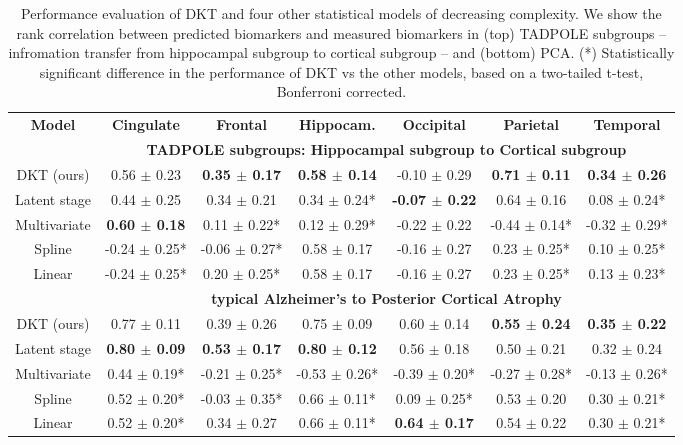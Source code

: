 \documentclass{llncs}
\begin{document}
\begin{table}
\centering
\fontsize{7}{10}\selectfont
\begin{tabular}{c | c c c c c c}
\textbf{Model} & \textbf{Cingulate} & \textbf{Frontal} & \textbf{Hippocam.} & \textbf{Occipital} & \textbf{Parietal} & \textbf{Temporal}\\
& \multicolumn{6}{c}{\textbf{TADPOLE subgroups: Hippocampal subgroup to Cortical subgroup}}\\
DKT (ours) &      0.56 $\pm$ 0.23 &    \textbf{0.35 $\pm$ 0.17} &        \textbf{0.58 $\pm$ 0.14} &     -0.10 $\pm$ 0.29 &     \textbf{0.71 $\pm$ 0.11} &     \textbf{0.34 $\pm$ 0.26} \\
Latent stage &      0.44 $\pm$ 0.25 &    0.34 $\pm$ 0.21 &       0.34 $\pm$ 0.24* &     \textbf{-0.07 $\pm$ 0.22} &     0.64 $\pm$ 0.16 &    0.08 $\pm$ 0.24* \\
Multivariate &      \textbf{0.60 $\pm$ 0.18} &   0.11 $\pm$ 0.22* &       0.12 $\pm$ 0.29* &     -0.22 $\pm$ 0.22 &   -0.44 $\pm$ 0.14* &   -0.32 $\pm$ 0.29* \\
Spline &    -0.24 $\pm$ 0.25* &  -0.06 $\pm$ 0.27* &        0.58 $\pm$ 0.17 &     -0.16 $\pm$ 0.27 &    0.23 $\pm$ 0.25* &    0.10 $\pm$ 0.25* \\
Linear &    -0.24 $\pm$ 0.25* &   0.20 $\pm$ 0.25* &        0.58 $\pm$ 0.17 &     -0.16 $\pm$ 0.27 &    0.23 $\pm$ 0.25* &    0.13 $\pm$ 0.23* \\
& \multicolumn{6}{c}{\textbf{typical Alzheimer's to Posterior Cortical Atrophy}}\\
DKT (ours) &    0.77 $\pm$ 0.11 &    0.39 $\pm$ 0.26 &      0.75 $\pm$ 0.09 &    0.60 $\pm$ 0.14 &    \textbf{0.55 $\pm$ 0.24} &    \textbf{0.35 $\pm$ 0.22} \\
Latent stage &    \textbf{0.80 $\pm$ 0.09} &    \textbf{0.53 $\pm$ 0.17} &      \textbf{0.80 $\pm$ 0.12} &    0.56 $\pm$ 0.18 &    0.50 $\pm$ 0.21 &    0.32 $\pm$ 0.24 \\
Multivariate &   0.44 $\pm$ 0.19* &  -0.21 $\pm$ 0.25* &    -0.53 $\pm$ 0.26* &  -0.39 $\pm$ 0.20* &  -0.27 $\pm$ 0.28* &  -0.13 $\pm$ 0.26* \\
Spline &   0.52 $\pm$ 0.20* &  -0.03 $\pm$ 0.35* &     0.66 $\pm$ 0.11* &   0.09 $\pm$ 0.25* &    0.53 $\pm$ 0.20 &   0.30 $\pm$ 0.21* \\
Linear &   0.52 $\pm$ 0.20* &    0.34 $\pm$ 0.27 &     0.66 $\pm$ 0.11* &    \textbf{0.64 $\pm$ 0.17} &    0.54 $\pm$ 0.22 &   0.30 $\pm$ 0.21* \\
\end{tabular}
\vspace{0.5em}
\caption[Performance evaluation of DKT and other models]{Performance evaluation of DKT and four other statistical models of decreasing complexity. We show the rank correlation between predicted biomarkers and measured biomarkers in (top) TADPOLE subgroups -- infromation transfer from hippocampal subgroup to cortical subgroup -- and (bottom) PCA. (*) Statistically significant difference in the performance of DKT vs the other models, based on a two-tailed t-test, Bonferroni corrected.}
\label{sec:dktPerfMetrics}
\end{table}
\end{document}
